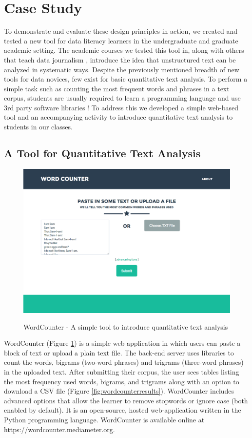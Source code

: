 \documentclass{acm_proc_article-sp}
\begin{document}
\section{Case Study}

To demonstrate and evaluate these design principles in action, we created and tested a new tool for data literacy learners in the undergraduate and graduate academic setting. The academic courses we tested this tool in, along with others that teach data journalism \cite{willis_text_2015}, introduce the idea that unstructured text can be analyzed in systematic ways. Despite the previously mentioned breadth of new tools for data novices, few exist for basic quantitative text analysis. To perform a simple task such as counting the most frequent words and phrases in a text corpus, students are usually required to learn a programming language and use 3rd party software libraries \cite{bird_natural_2009}! To address this we developed a simple web-based tool and an accompanying activity to introduce quantitative text analysis to students in our classes.

\subsection{A Tool for Quantitative Text Analysis}

\begin{figure}[h]
\caption{WordCounter - A simple tool to introduce quantitative text analysis}
\includegraphics[width=\linewidth]{wordcounter}
\label{fig:wordcounter}
\end{figure}

WordCounter (Figure \ref{fig:wordcounter}) is a simple web application in which users can paste a block of text or upload a plain text file. The back-end server uses libraries to count the words, bigrams (two-word phrases) and trigrams (three-word phrases) in the uploaded text. After submitting their corpus, the user sees tables listing the most frequency used words, bigrams, and trigrams along with an option to download a CSV file (Figure \ref{fig:wordcounterresults}). WordCounter includes advanced options that allow the learner to remove stopwords or ignore case (both enabled by default). It is an open-source, hosted web-application written in the Python programming language.  WordCounter is available online at https://wordcounter.mediameter.org.
\end{document}
